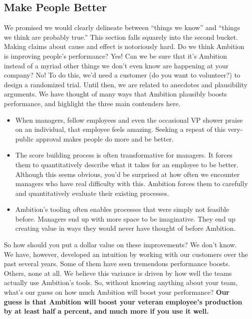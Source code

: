 \documentclass[paper=a4, fontsize=11pt abstract]{scrartcl}
\numberwithin{equation}{section}		%
\numberwithin{figure}{section}			%
\numberwithin{table}{section}				%
\begin{document}
\subsection{Make People Better}
We promised we would clearly delineate between ``things we know'' and ``things we think are probably true.''
This section falls squarely into the second bucket.
Making claims about cause and effect is notoriously hard.
Do we think Ambition is improving people's performance?  Yes!
Can we be sure that it's Ambition instead of a myriad other things we don't even know are happening at your company?  No!
To do this, we'd need  a customer (do you want to volunteer?) to design a randomized trial.
Until then, we are related to anecdotes and plausibility arguments.
We have thought of many ways that Ambition plausibly boosts performance, and highlight the three main contenders here.
\begin{itemize}
    \item When managers, fellow employees and even the occasional VP shower praise on an individual, that employee feels amazing.
    Seeking a repeat of this very-public approval makes people do more and be better.
    
    \item The score building process is often transformative for managers.
    It forces them to quantitatively describe what it takes for an employee to be better.
    Although this seems obvious, you'd be surprised at how often we encounter managers who have real difficulty with this.
    Ambition forces them to carefully and quantitatively evaluate their existing processes.
    
    \item Ambition's tooling often enables processes that were simply not feasible before.
    Managers end up with more space to be imaginative.
    They end up creating value in ways they would never have thought of before Ambition.
\end{itemize}

So how should you put a dollar value on these improvements?
We don't know.
We have, however, developed an intuition by working with our customers over the past several years.
Some of them have seen tremendous performance boosts.
Others, none at all.
We believe this variance is driven by how well the teams actually use Ambition's tools.
So, without knowing anything about your team, what's our guess on how much Ambition will boost your performance?
\textbf{Our guess is that Ambition will boost your veteran employee's production by at least half a percent, and much more if you use it well.}
\end{document}
